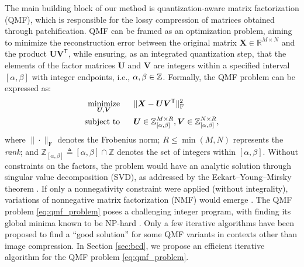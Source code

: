 The main building block of our method is quantization-aware matrix factorization (QMF), which is responsible for the lossy compression of matrices obtained through patchification. QMF can be framed as an optimization problem, aiming to minimize the reconstruction error between the original matrix $\bm{X} \in \mathbb{R}^{M \times N}$ and the product $\bm{U} \bm{V}^\mathsf{T}$, while ensuring, as an integrated quantization step, that the elements of the factor matrices $\bm{U}$ and $\bm{V}$ are integers within a specified interval $[\alpha,\beta]$ with integer endpoints, i.e., $\alpha,\beta \in \mathbb{Z}$. Formally, the QMF problem can be expressed as:
\begin{align} \label{eq:qmf_problem}
    \operatorname*{minimize}_{\bm{U}, \bm{V}}  \quad & \ \  \| \bm{X} - \bm{U} \bm{V}^\mathsf{T} \|_\text{F}^2 \nonumber                                             \\
    \text{subject to} \quad                 & \ \ \bm{U} \in \mathbb{Z}_{[\alpha,\beta]}^{M \times R}, \bm{V} \in \mathbb{Z}_{[\alpha,\beta]}^{N \times R},
\end{align}
where $\|\cdot\|_\text{F}$ denotes the Frobenius norm; $R \leq \min(M,N)$ represents the \emph{rank}; and $\mathbb{Z}_{[\alpha,\beta]} \triangleq [\alpha,\beta] \cap \mathbb{Z}$ denotes the set of integers within $[\alpha,\beta]$. Without constraints on the factors, the problem would have an analytic solution through singular value decomposition (SVD), as addressed by the Eckart–Young–Mirsky theorem \cite{eckart1936approximation}. If only a nonnegativity constraint were applied (without integrality), variations of nonnegative matrix factorization (NMF) would emerge \cite{lee2000algorithms, gillis2020nonnegative}. The QMF problem \eqref{eq:qmf_problem} poses a challenging integer program, with finding its global minima known to be NP-hard \cite{dong2018integer, van1981another}. Only a few iterative algorithms \cite{dong2018integer, lin2005integer} have been proposed to find a ``good solution'' for some QMF variants in contexts other than image compression. In Section \ref{sec:bcd}, we propose an efficient iterative algorithm for the QMF problem \eqref{eq:qmf_problem}.

